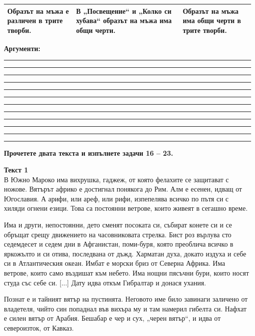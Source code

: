 \documentclass[12pt,a4paper]{article}
\begin{document}
\vspace{0.3cm}

\noindent
\begin{tabularx}{\linewidth}{|>{\centering\arraybackslash}X|>{\centering\arraybackslash}X|>{\centering\arraybackslash}X|}
\hline
Образът на мъжа е различен в трите творби. & В „Посвещение“ и „Колко си хубава“ образът на мъжа има общи черти. & Образът на мъжа има общи черти в трите творби. \\
\hline
\end{tabularx}

\vspace{0.4cm}

\noindent
\textbf{Аргументи:} \\
\noindent\rule{\linewidth}{0.4pt}
\noindent\rule{\linewidth}{0.4pt}
\noindent\rule{\linewidth}{0.4pt}
\noindent\rule{\linewidth}{0.4pt}
\noindent\rule{\linewidth}{0.4pt}
\noindent\rule{\linewidth}{0.4pt}
\noindent\rule{\linewidth}{0.4pt}
\noindent\rule{\linewidth}{0.4pt}
\noindent\rule{\linewidth}{0.4pt}
\noindent\rule{\linewidth}{0.4pt}
\noindent\rule{\linewidth}{0.4pt}
\noindent\rule{\linewidth}{0.4pt}

\vspace{0.6cm}

\noindent
\textbf{Прочетете двата текста и изпълнете задачи 16 – 23.}

\vspace{0.4cm}

\noindent
\textbf{Текст 1} \\
В Южно Мароко има вихрушка, гаджеж, от която фелахите се защитават с ножове. Вятърът африко е достигнал понякога до Рим. Алм е есенен, идващ от Югославия. А арифи, или ареф, или рифи, изпепелява всичко по пътя си с хиляди огнени езици. Това са постоянни ветрове, които живеят в сегашно време.

Има и други, непостоянни, дето сменят посоката си, събират конете си и се обръщат срещу движението на часовниковата стрелка. Бист роз върлува сто седемдесет и седем дни в Афганистан, поми-буря, която преоблича всичко в яркожълто и си отива, последвана от дъжд. Харматан духа, докато издуха и себе си в Атлантическия океан. Имбат е морски бриз от Северна Африка. Има ветрове, които само въздишат към небето. Има нощни пясъчни бури, които носят студа със себе си. [...] Дату идва откъм Гибралтар и донася ухания.

Познат е и тайният вятър на пустинята. Неговото име било завинаги заличено от владетеля, чийто син попаднал във вихъра му и там намерил гибелта си. Нафхат е силен вятър от Арабия. Бешабар е чер и сух, „черен вятър“, и идва от североизток, от Кавказ.
\end{document}
